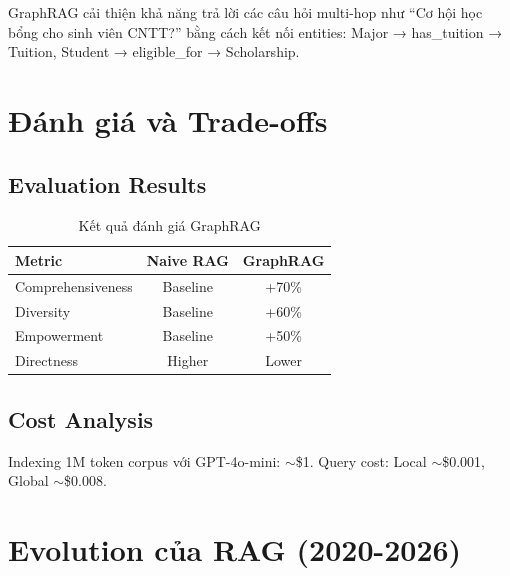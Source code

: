 \documentclass[conference]{IEEEtran}
\begin{document}
GraphRAG cải thiện khả năng trả lời các câu hỏi multi-hop như ``Cơ hội học bổng cho sinh viên CNTT?'' bằng cách kết nối entities: Major → has\_tuition → Tuition, Student → eligible\_for → Scholarship.

\section{Đánh giá và Trade-offs}

\subsection{Evaluation Results}

\begin{table}[htbp]
\caption{Kết quả đánh giá GraphRAG}
\begin{center}
\begin{tabular}{|l|c|c|}
\hline
\textbf{Metric} & \textbf{Naive RAG} & \textbf{GraphRAG} \\
\hline
Comprehensiveness & Baseline & +70\% \\
\hline
Diversity & Baseline & +60\% \\
\hline
Empowerment & Baseline & +50\% \\
\hline
Directness & Higher & Lower \\
\hline
\end{tabular}
\end{center}
\end{table}

\subsection{Cost Analysis}

Indexing 1M token corpus với GPT-4o-mini: $\sim$\$1. Query cost: Local $\sim$\$0.001, Global $\sim$\$0.008.

\section{Evolution của RAG (2020-2026)}
\end{document}
